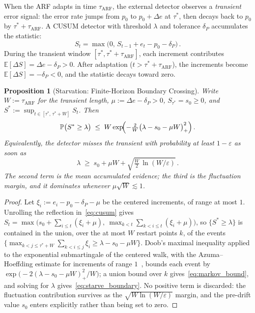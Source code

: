 \documentclass[10pt,conference]{IEEEtran}
\newtheorem{proposition}[theorem]{Proposition}
\theoremstyle{definition}
\begin{document}
When the ARF adapts in time $\tau_{\mathrm{ARF}}$, the external detector observes a \emph{transient} error signal: the error rate jumps from $p_0$ to $p_0 + \Delta e$ at $\tau^*$, then decays back to $p_0$ by $\tau^* + \tau_{\mathrm{ARF}}$.
A CUSUM detector with threshold $\lambda$ and tolerance $\delta_P$ accumulates the statistic:
\begin{equation}\label{eq:cusum}
  S_t = \max\bigl(0,\, S_{t-1} + e_t - p_0 - \delta_P\bigr)\,.
\end{equation}
During the transient window $[\tau^*, \tau^* + \tau_{\mathrm{ARF}}]$, each increment contributes $\mathbb{E}[\Delta S] = \Delta e - \delta_P > 0$.
After adaptation ($t > \tau^* + \tau_{\mathrm{ARF}}$), the increments become $\mathbb{E}[\Delta S] = -\delta_P < 0$, and the statistic decays toward zero.

\begin{proposition}[Starvation: Finite-Horizon Boundary Crossing]\label{prop:starvation}
  Write $W := \tau_{\mathrm{ARF}}$ for the transient length, $\mu := \Delta e - \delta_P > 0$, $S_{\tau^*} = s_0 \ge 0$, and $S^* := \sup_{t\in[\tau^*,\, \tau^* + W]} S_t$. Then
  \begin{equation}\label{eq:markov_bound}
    \mathbb{P}\bigl(S^* \ge \lambda\bigr) \;\le\; W \exp\!\Bigl(-\tfrac{2}{W}\bigl(\lambda - s_0 - \mu W\bigr)_{+}^{2}\Bigr)\,.
  \end{equation}
  Equivalently, the detector misses the transient with probability at least $1-\varepsilon$ as soon as
  \begin{equation}\label{eq:starve_boundary}
    \lambda \;\ge\; s_0 + \mu W + \sqrt{\tfrac{W}{2}\,\ln(W/\varepsilon)}\,.
  \end{equation}
  The second term is the mean accumulated evidence; the third is the fluctuation margin, and it dominates whenever $\mu\sqrt{W} \lesssim 1$.
\end{proposition}

\begin{proof}
  Let $\xi_i := e_i - p_0 - \delta_P - \mu$ be the centered increments, of range at most $1$. Unrolling the reflection in~\eqref{eq:cusum} gives $S_t = \max\bigl(s_0 + \sum_{i \le t}(\xi_i + \mu),\ \max_{k < t}\sum_{k < i \le t}(\xi_i + \mu)\bigr)$, so $\{S^* \ge \lambda\}$ is contained in the union, over the at most $W$ restart points $k$, of the events $\bigl\{\max_{k < j \le \tau^*+W}\sum_{k < i \le j}\xi_i \ge \lambda - s_0 - \mu W\bigr\}$. Doob's maximal inequality applied to the exponential submartingale of the centered walk, with the Azuma--Hoeffding estimate for increments of range $1$~\cite{hoeffding_1963,tartakovsky_2014}, bounds each event by $\exp\bigl(-2(\lambda - s_0 - \mu W)_{+}^{2}/W\bigr)$; a union bound over $k$ gives~\eqref{eq:markov_bound}, and solving for $\lambda$ gives~\eqref{eq:starve_boundary}. No positive term is discarded: the fluctuation contribution survives as the $\sqrt{W \ln(W/\varepsilon)}$ margin, and the pre-drift value $s_0$ enters explicitly rather than being set to zero.
\end{proof}
\end{document}
